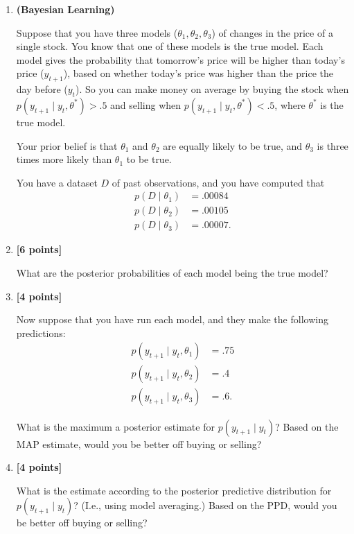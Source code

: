 \documentclass{article}
\newcounter{totalpoints}
\newcommand{\points}[1]{{\addtocounter{totalpoints}{#1}\textbf{[#1 points]}}}
\begin{document}
\begin{enumerate}
\clearpage
\item \textbf{(Bayesian Learning)}

Suppose that you have three models ($\theta_1,\theta_2,\theta_3$) of changes in the price of a single stock.
You know that one of these models is the true model.  Each model gives the probability that tomorrow's price will be higher than today's price ($y_{t+1}$), based on whether today's price was higher than the price the day before ($y_t$).  So you can make money on average by buying the stock when $p(y_{t+1} \mid y_t, \theta^*) > .5$ and selling when $p(y_{t+1} \mid y_t, \theta^*) < .5$, where $\theta^*$ is the true model.

Your prior belief is that $\theta_1$ and $\theta_2$ are equally likely to be true, and $\theta_3$ is three times more likely than $\theta_1$ to be true.

You have a dataset $D$ of past observations, and you have computed that
\begin{align*}
    p(D \mid \theta_1) &= .00084 \\
    p(D \mid \theta_2) &= .00105 \\
    p(D \mid \theta_3) &= .00007.
\end{align*}

\item \points{6}
What are the posterior probabilities of each model being the true model?
\begin{answer}{1.5in}
\end{answer}

\item \points{4}
Now suppose that you have run each model, and they make the following predictions:
\begin{align*}
    p(y_{t+1} \mid y_t, \theta_1) &= .75 \\
    p(y_{t+1} \mid y_t, \theta_2) &= .4 \\
    p(y_{t+1} \mid y_t, \theta_3) &= .6.
\end{align*}

What is the maximum a posterior estimate for $p(y_{t+1} \mid y_t)$?
Based on the MAP estimate, would you be better off buying or selling?

\begin{answer}{1.5in}
\end{answer}

\item \points{4}

What is the estimate according to the posterior predictive distribution for $p(y_{t+1} \mid y_t)$?
(I.e., using model averaging.)
Based on the PPD, would you be better off buying or selling?

\begin{answer}{1.5in}
\end{answer}

\end{enumerate}
\end{document}
